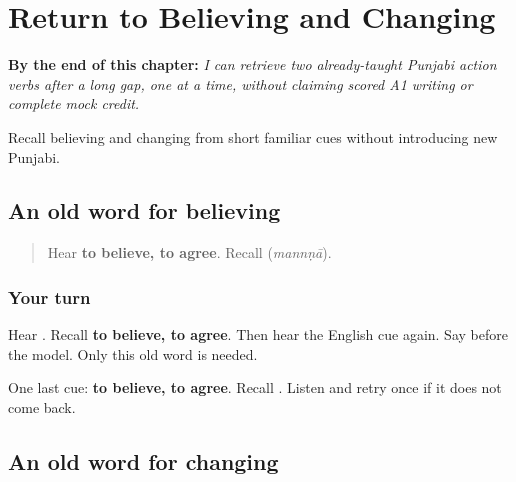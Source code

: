 
\chapter{Return to Believing and Changing}
\label{ch:pa-believe-change-r4}

\begin{chapteropening}
\textbf{By the end of this chapter:} \emph{I can retrieve two already-taught Punjabi action verbs after a long gap, one at a time, without claiming scored A1 writing or complete mock credit.}

Recall believing and changing from short familiar cues without introducing new Punjabi.
\end{chapteropening}

\section[\texorpdfstring{\pa{ਮੰਨਣਾ} (mannṇā)}{ਮੰਨਣਾ (mannṇā)}]{An old word for believing}

\label{lesson:PA-R167-believe-again}



\begin{quote}
Hear \textbf{to believe, to agree}. Recall \textbf{} (\emph{mannṇā}).
\end{quote}

\subsection*{Your turn}
Hear \textbf{}. Recall \textbf{to believe, to agree}. Then hear the English cue again. Say \textbf{} before the model. Only this old word is needed.

\begin{tcolorbox}[breakable,colback=teal!4,colframe=teal!35!black,title={Before you move on}]
One last cue: \textbf{to believe, to agree}. Recall \textbf{}. Listen and retry once if it does not come back.
\end{tcolorbox}
\section[\texorpdfstring{\pa{ਬਦਲਣਾ} (badalṇā)}{ਬਦਲਣਾ (badalṇā)}]{An old word for changing}

